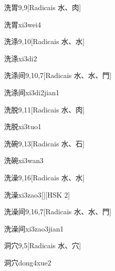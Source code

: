 \begin{entry}{洗胃}{9,9}[Radicais ⽔、⾁]
  \begin{phonetics}{洗胃}{xi3wei4}
  \end{phonetics}
\end{entry}

\begin{entry}{洗涤}{9,10}[Radicais ⽔、⽔]
  \begin{phonetics}{洗涤}{xi3di2}
  \end{phonetics}
\end{entry}

\begin{entry}{洗涤间}{9,10,7}[Radicais ⽔、⽔、⾨]
  \begin{phonetics}{洗涤间}{xi3di2jian1}
  \end{phonetics}
\end{entry}

\begin{entry}{洗脱}{9,11}[Radicais ⽔、⾁]
  \begin{phonetics}{洗脱}{xi3tuo1}
  \end{phonetics}
\end{entry}

\begin{entry}{洗碗}{9,13}[Radicais ⽔、⽯]
  \begin{phonetics}{洗碗}{xi3wan3}
  \end{phonetics}
\end{entry}

\begin{entry}{洗澡}{9,16}[Radicais ⽔、⽔]
  \begin{phonetics}{洗澡}{xi3zao3}[][HSK 2]
  \end{phonetics}
\end{entry}

\begin{entry}{洗澡间}{9,16,7}[Radicais ⽔、⽔、⾨]
  \begin{phonetics}{洗澡间}{xi3zao3jian1}
  \end{phonetics}
\end{entry}

\begin{entry}{洞穴}{9,5}[Radicais ⽔、⽳]
  \begin{phonetics}{洞穴}{dong4xue2}
  \end{phonetics}
\end{entry}


